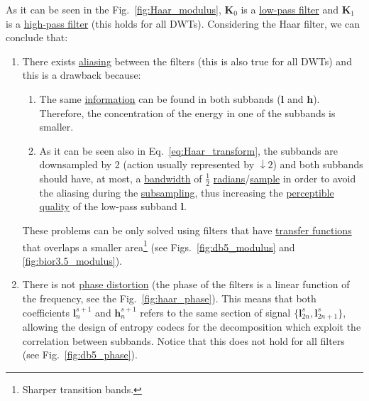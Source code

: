 As it can be seen in the Fig.~\ref{fig:Haar_modulus}, ${\mathbf K}_0$ is a
\href{https://en.wikipedia.org/wiki/Low-pass_filter}{low-pass filter}
and ${\mathbf K}_1$ is a
\href{https://en.wikipedia.org/wiki/High-pass_filter}{high-pass
  filter} (this holds for all DWTs). Considering the Haar filter, we
can conclude that:
\begin{enumerate}
\item There exists
  \href{https://en.wikipedia.org/wiki/Aliasing}{aliasing} between the
  filters (this is also true for all DWTs) and this is a drawback
  because: \begin{enumerate} \item The same
    \href{https://en.wikipedia.org/wiki/Information}{information} can
    be found in both subbands (${\mathbf l}$ and ${\mathbf
      h}$). Therefore, the concentration of the energy in one of the
    subbands is smaller.
  \item As it can be seen also in Eq.~\eqref{eq:Haar_transform}, the
    subbands are downsampled by 2 (action usually represented by
    $\downarrow 2$) and both subbands should have, at most, a
    \href{https://en.wikipedia.org/wiki/Bandwidth_(signal_processing)}{bandwidth}
    of $\frac{1}{2}$
    \href{https://en.wikipedia.org/wiki/Radian}{radians}/\href{https://en.wikipedia.org/wiki/Sampling_(signal_processing)}{sample}
    in order to avoid the aliasing during the
    \href{https://en.wikipedia.org/wiki/Downsampling_(signal_processing)}{subsampling},
    thus increasing the
    \href{https://en.wikipedia.org/wiki/Perception}{perceptible}
    \href{https://en.wikipedia.org/wiki/Signal-to-noise_ratio}{quality}
    of the low-pass subband ${\mathbf l}$.  \end{enumerate} These
  problems can be only solved using filters that have
  \href{https://en.wikipedia.org/wiki/Transfer_function}{transfer
    functions} that overlaps a smaller area\footnote{Sharper
  transition bands.} (see Figs.~\ref{fig:db5_modulus} and
  \ref{fig:bior3.5_modulus}).
\item There is not
  \href{https://en.wikipedia.org/wiki/Linear_phase}{phase distortion}
  (the phase of the filters is a linear function of the frequency, see
  the Fig.~\ref{fig:haar_phase}). This means that both coefficients
  ${\mathbf l}^{s+1}_n$ and ${\mathbf h}^{s+1}_n$ refers to the same section of signal
  $\{{\mathbf l}^s_{2n}, {\mathbf l}^s_{2n+1}\}$, allowing the design of entropy codecs
  for the decomposition which exploit the correlation between
  subbands. Notice that this does not hold for all filters (see
  Fig.~\ref{fig:db5_phase}).
\end{enumerate}

